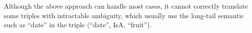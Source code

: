 Although the above approach can handle most cases, it cannot correctly translate some triples with intractable ambiguity, which usually use the long-tail semantic \cite{Tugwell20009} such as ``date'' in the triple (``date'', IsA, ``fruit''). 

